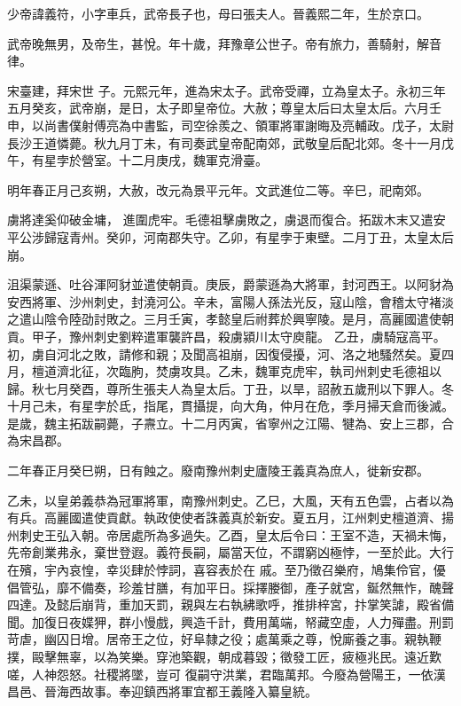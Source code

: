 
\begin{pinyinscope}

 少帝諱義符，小字車兵，武帝長子也，母曰張夫人。晉義熙二年，生於京口。



 武帝晚無男，及帝生，甚悅。年十歲，拜豫章公世子。帝有旅力，善騎射，解音律。



 宋臺建，拜宋世
 子。元熙元年，進為宋太子。武帝受禪，立為皇太子。永初三年五月癸亥，武帝崩，是日，太子即皇帝位。大赦；尊皇太后曰太皇太后。六月壬申，以尚書僕射傅亮為中書監，司空徐羨之、領軍將軍謝晦及亮輔政。戊子，太尉長沙王道憐薨。秋九月丁未，有司奏武皇帝配南郊，武敬皇后配北郊。冬十一月戊午，有星孛於營室。十二月庚戌，魏軍克滑臺。



 明年春正月己亥朔，大赦，改元為景平元年。文武進位二等。辛巳，祀南郊。



 虜將達奚仰破金墉，
 進圍虎牢。毛德祖擊虜敗之，虜退而復合。拓跋木末又遣安平公涉歸寇青州。癸卯，河南郡失守。乙卯，有星孛于東壁。二月丁丑，太皇太后崩。



 沮渠蒙遜、吐谷渾阿豺並遣使朝貢。庚辰，爵蒙遜為大將軍，封河西王。以阿豺為安西將軍、沙州刺史，封澆河公。辛未，富陽人孫法光反，寇山陰，會稽太守褚淡之遣山陰令陸劭討敗之。三月壬寅，孝懿皇后祔葬於興寧陵。是月，高麗國遣使朝貢。甲子，豫州刺史劉粹遣軍襲許昌，殺虜潁川太守庾龍。
 乙丑，虜騎寇高平。初，虜自河北之敗，請修和親；及聞高祖崩，因復侵擾，河、洛之地騷然矣。夏四月，檀道濟北征，次臨朐，焚虜攻具。乙未，魏軍克虎牢，執司州刺史毛德祖以歸。秋七月癸酉，尊所生張夫人為皇太后。丁丑，以旱，詔赦五歲刑以下罪人。冬十月己未，有星孛於氐，指尾，貫攝提，向大角，仲月在危，季月掃天倉而後滅。是歲，魏主拓跋嗣薨，子燾立。十二月丙寅，省寧州之江陽、犍為、安上三郡，合為宋昌郡。



 二年春正月癸巳朔，日有蝕之。廢南豫州刺史廬陵王義真為庶人，徙新安郡。



 乙未，以皇弟義恭為冠軍將軍，南豫州刺史。乙巳，大風，天有五色雲，占者以為有兵。高麗國遣使貢獻。執政使使者誅義真於新安。夏五月，江州刺史檀道濟、揚州刺史王弘入朝。帝居處所為多過失。乙酉，皇太后令曰：王室不造，天禍未悔，先帝創業弗永，棄世登遐。義符長嗣，屬當天位，不謂窮凶極悖，一至於此。大行在殯，宇內哀惶，幸災肆於悖詞，喜容表於在
 戚。至乃徵召樂府，鳩集伶官，優倡管弘，靡不備奏，珍羞甘膳，有加平日。採擇媵御，產子就宮，鋋然無怍，醜聲四達。及懿后崩背，重加天罰，親與左右執紼歌呼，推排梓宮，抃掌笑謔，殿省備聞。加復日夜媟狎，群小慢戲，興造千計，費用萬端，帑藏空虛，人力殫盡。刑罰苛虐，幽囚日增。居帝王之位，好阜隸之役；處萬乘之尊，悅廝養之事。親執鞭撲，毆擊無辜，以為笑樂。穿池築觀，朝成暮毀；徵發工匠，疲極兆民。遠近歎嗟，人神怨怒。社稷將墜，豈可
 復嗣守洪業，君臨萬邦。今廢為營陽王，一依漢昌邑、晉海西故事。奉迎鎮西將軍宜都王義隆入纂皇統。




\end{pinyinscope}
